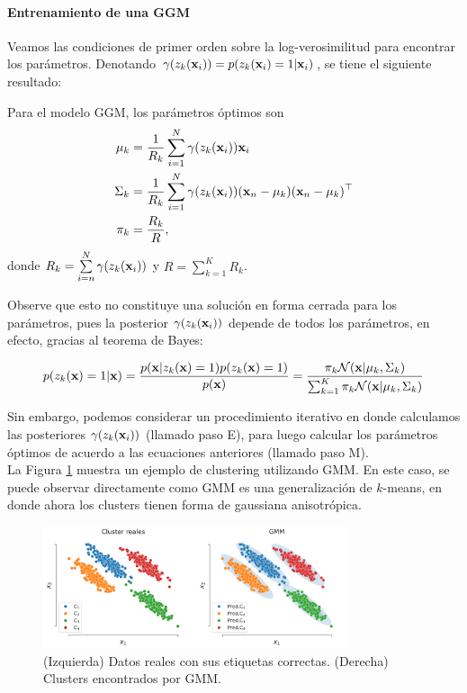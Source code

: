 \paragraph{Entrenamiento de una GGM}

Veamos las condiciones de primer orden sobre la log-verosimilitud para encontrar los parámetros. Denotando $\gamma(z_k(\mathbf{x}_i)) = p(z_k(\mathbf{x}_i)=1|\mathbf{x}_i)$, se tiene el siguiente resultado:

\begin{lemma} Para el modelo GGM, los parámetros óptimos son
	\begin{align}
    \mu_k & = \frac{1}{R_k}\sum_{i=1}^N \gamma(z_k(\mathbf{x}_i))\mathbf{x}_i\\
    \Sigma_k & = \frac{1}{R_k} \sum_{i=1}^N \gamma(z_k(\mathbf{x}_i))(\mathbf{x}_n - \mu_k)(\mathbf{x}_n - \mu_k)^\top\\
    \pi_k & = \frac{R_k}{R},
    \end{align}
    donde $R_k = \sum\limits_{i=n}^N \gamma(z_k(\mathbf{x}_i))$ y $R = \sum\limits_{k=1}^K R_k$.
\end{lemma}

Observe que esto no constituye una solución en forma cerrada para los parámetros, pues la posterior $\gamma(z_k(\mathbf{x}_i))$ depende de todos los parámetros, en efecto, gracias al teorema de Bayes:

\begin{align}
	p(z_k(\mathbf{x})=1|\mathbf{x}) = \frac{p(\mathbf{x}|z_k(\mathbf{x})=1)p(z_k(\mathbf{x})=1)}{p(\mathbf{x})} = \frac{\pi_k {\mathcal N}(\mathbf{x}|\mu_k,\Sigma_k)}{\sum_{k=1}^K \pi_k {\mathcal N}(\mathbf{x}|\mu_k,\Sigma_k)} 
\end{align} 


Sin embargo, podemos considerar un procedimiento iterativo en donde calculamos las posteriores $\gamma(z_k(\mathbf{x}_i))$ (llamado paso E), para luego calcular los parámetros óptimos de acuerdo a las ecuaciones anteriores (llamado paso M).\\

La Figura \ref{fig:gmm} muestra un ejemplo de clustering utilizando GMM. En este caso, se puede observar directamente como GMM es una generalización de $k$-means, en donde ahora los clusters tienen forma de gaussiana anisotrópica.

\begin{figure}[ht]
  \centering
  \includegraphics[width=0.8\textwidth]{img/cap6_gmm}
  \caption{(Izquierda) Datos reales con sus etiquetas correctas. (Derecha) Clusters encontrados por GMM.}
  \label{fig:gmm}
\end{figure}


